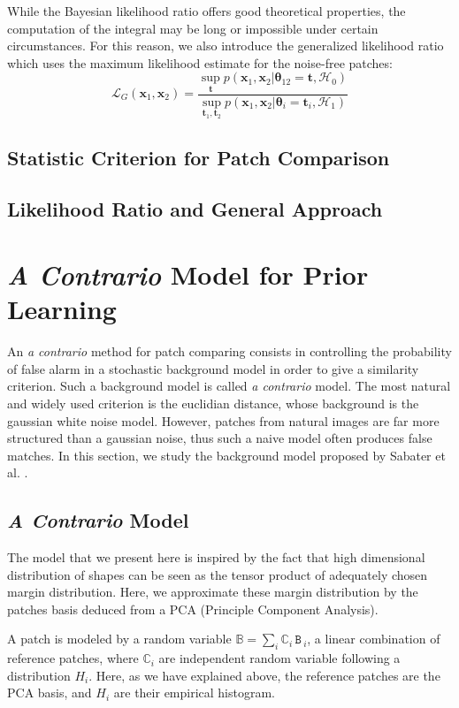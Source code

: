 \documentclass[runningheads]{llncs}
\newcommand{\mat}[1]{\ensuremath{\,\mathtt{#1}\,}}
\newcommand{\rand}[1]{\ensuremath{\mathbb{#1}}}
\begin{document}
While the Bayesian likelihood ratio offers good theoretical properties, the computation of the integral may be long or impossible under certain circumstances. For this reason, we also introduce the generalized likelihood ratio which uses the maximum likelihood estimate for the noise-free patches:
\[
\mathcal{L}_G(\mathbf{x}_1,\mathbf{x}_2)=\frac{\sup_{\mathbf{t}}p(\mathbf{x}_1,\mathbf{x}_2|\boldsymbol\theta_{12}=\mathbf{t}, \mathcal{H}_0)}{\sup_{\mathbf{t}_1,\mathbf{t}_2}p(\mathbf{x}_1,\mathbf{x}_2|\boldsymbol\theta_i=\mathbf{t}_i, \mathcal{H}_1)}
\]
\subsection{Statistic Criterion for Patch Comparison}
\subsection{Likelihood Ratio and General Approach}

\section{\textit{A Contrario} Model for Prior Learning}

An \textit{a contrario} method for patch comparing consists in controlling the probability of false alarm in a stochastic background model in order to give a similarity criterion. Such a background model is called \textit{a contrario} model. The most natural and widely used criterion is the euclidian distance, whose background is the gaussian white noise model. However, patches from natural images are far more structured than a gaussian noise, thus such a naive model often produces false matches. In this section, we study the background model proposed by Sabater et al. \cite{Sabater:2012}.
\subsection{\textit{A Contrario} Model}

The model that we present here is inspired by the fact that high dimensional distribution of shapes can be seen as the tensor product of adequately chosen margin distribution. Here, we approximate these margin distribution by the patches basis deduced from a PCA (Principle Component Analysis). 

A patch is modeled by a random variable $\rand{B}=\sum_i \rand{C}_i \mat{B}_i$, a linear combination of reference patches, where $\rand{C}_i$ are independent random variable following a distribution $H_i$. Here, as we have explained above, the reference patches are the PCA basis, and $ H_i$ are their empirical histogram.
\end{document}
